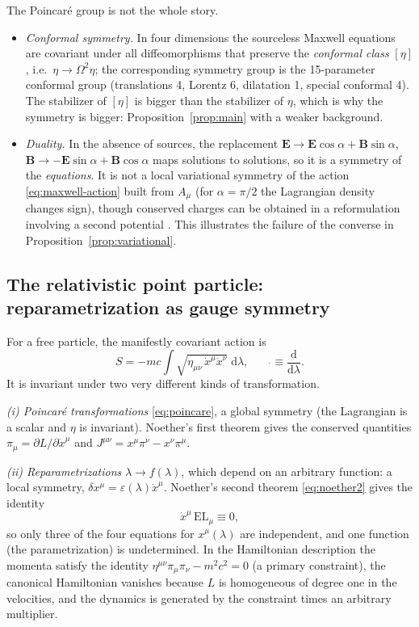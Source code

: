 \documentclass[11pt,a4paper,openany]{book}
\theoremstyle{definition}
\theoremstyle{plain}
\theoremstyle{remark}
\newcommand{\dd}{\mathrm{d}}
\newcommand{\eps}{\varepsilon}
\newcommand{\vE}{\bm{E}}
\newcommand{\vB}{\bm{B}}
\begin{document}
The Poincar\'e group is not the whole story.
\begin{itemize}[leftmargin=1.6em,itemsep=2pt]
\item \emph{Conformal symmetry.} In four dimensions the sourceless Maxwell
  equations are covariant under all diffeomorphisms that preserve the
  \emph{conformal class} $[\eta]$, i.e.\ $\eta\to\Omega^2\eta$; the
  corresponding symmetry group is the 15-parameter conformal group
  (translations 4, Lorentz 6, dilatation 1, special conformal 4). The
  stabilizer of $[\eta]$ is bigger than the stabilizer of $\eta$, which is why
  the symmetry is bigger: Proposition~\ref{prop:main} with a weaker background.
\item \emph{Duality.} In the absence of sources, the replacement
  $\vE\to\vE\cos\alpha+\vB\sin\alpha$, $\vB\to-\vE\sin\alpha+\vB\cos\alpha$
  maps solutions to solutions, so it is a symmetry of the \emph{equations}.
  It is not a local variational symmetry of the action \eqref{eq:maxwell-action}
  built from $A_\mu$ (for $\alpha=\pi/2$ the Lagrangian density changes sign),
  though conserved charges can be obtained in a reformulation involving a
  second potential \cite{deser}. This illustrates the failure of the converse
  in Proposition~\ref{prop:variational}.
\end{itemize}

\subsection{The relativistic point particle: reparametrization as gauge symmetry}

For a free particle, the manifestly covariant action is
\begin{equation}\label{eq:particle}
  S=-mc\int\sqrt{\eta_{\mu\nu}\,\dot x^\mu\dot x^\nu}\;\dd\lambda ,
  \qquad \dot{}\equiv\frac{\dd}{\dd\lambda}.
\end{equation}
It is invariant under two very different kinds of transformation.

\emph{(i) Poincar\'e transformations} \eqref{eq:poincare}, a global
symmetry (the Lagrangian is a scalar and $\eta$ is invariant). Noether's first
theorem gives the conserved quantities $\pi_\mu=\partial L/\partial\dot x^\mu$
and $J^{\mu\nu}=x^\mu\pi^\nu-x^\nu\pi^\mu$.

\emph{(ii) Reparametrizations} $\lambda\to f(\lambda)$, which depend on an
arbitrary function: a local symmetry, $\delta x^\mu=\eps(\lambda)\dot x^\mu$.
Noether's second theorem \eqref{eq:noether2} gives the identity
\begin{equation}\label{eq:param-identity}
  \dot x^\mu\,\mathrm{EL}_\mu\equiv0,
\end{equation}
so only three of the four equations for $x^\mu(\lambda)$ are independent, and
one function (the parametrization) is undetermined. In the Hamiltonian
description the momenta satisfy the identity
$\eta^{\mu\nu}\pi_\mu\pi_\nu-m^2c^2=0$ (a primary constraint), the canonical
Hamiltonian vanishes because $L$ is homogeneous of degree one in the
velocities, and the dynamics is generated by the constraint times an arbitrary
multiplier.
\end{document}
